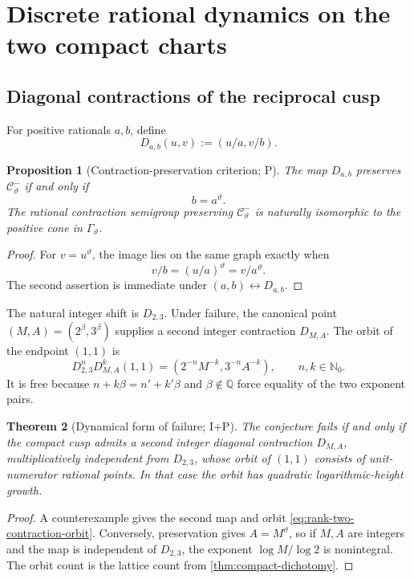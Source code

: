 \documentclass[10pt,oneside]{article}
\newtheorem{theorem}{Theorem}[section]
\newtheorem{proposition}[theorem]{Proposition}
\theoremstyle{definition}
\theoremstyle{remark}
\newcommand{\Nzero}{\mathbb N_0}
\newcommand{\Q}{\mathbb Q}
\newcommand{\thetaq}{\vartheta}
\newcommand{\rec}{\mathcal C^-_{\thetaq}}
\newcommand{\statusP}{\textsc{P}}
\newcommand{\statusI}{\textsc{I}}
\begin{document}
\section{Discrete rational dynamics on the two compact charts}
\label{sec:discrete-dynamics}

\subsection{Diagonal contractions of the reciprocal cusp}
For positive rationals \(a,b\), define
\[
 D_{a,b}(u,v):=(u/a,v/b).
\]

\begin{proposition}[Contraction-preservation criterion; \statusP]
\label{prop:contraction-preservation}
The map \(D_{a,b}\) preserves \(\rec\) if and only if
\[
 b=a^{\thetaq}.
\]
The rational contraction semigroup preserving \(\rec\) is naturally isomorphic to the positive cone in \(\Gamma_{\thetaq}\).
\end{proposition}

\begin{proof}
For \(v=u^{\thetaq}\), the image lies on the same graph exactly when
\[
 v/b=(u/a)^{\thetaq}=v/a^{\thetaq}.
\]
The second assertion is immediate under \((a,b)\leftrightarrow D_{a,b}\).
\end{proof}

The natural integer shift is \(D_{2,3}\).  Under failure, the canonical point \((M,A)=(2^\beta,3^\beta)\) supplies a second integer contraction \(D_{M,A}\).  The orbit of the endpoint \((1,1)\) is
\begin{equation}
 D_{2,3}^nD_{M,A}^k(1,1)
 =\left(2^{-n}M^{-k},3^{-n}A^{-k}\right),
 \qquad n,k\in\Nzero.
\label{eq:rank-two-contraction-orbit}
\end{equation}
It is free because \(n+k\beta=n'+k'\beta\) and \(\beta\notin\Q\) force equality of the two exponent pairs.

\begin{theorem}[Dynamical form of failure; \statusI+\statusP]
\label{thm:dynamical-failure}
The conjecture fails if and only if the compact cusp admits a second integer diagonal contraction \(D_{M,A}\), multiplicatively independent from \(D_{2,3}\), whose orbit of \((1,1)\) consists of unit-numerator rational points.  In that case the orbit has quadratic logarithmic-height growth.
\end{theorem}

\begin{proof}
A counterexample gives the second map and orbit \eqref{eq:rank-two-contraction-orbit}.  Conversely, preservation gives
\(A=M^{\thetaq}\), so if \(M,A\) are integers and the map is independent of \(D_{2,3}\), the exponent \(\log M/\log2\) is nonintegral.  The orbit count is the lattice count from \cref{thm:compact-dichotomy}.
\end{proof}
\end{document}
